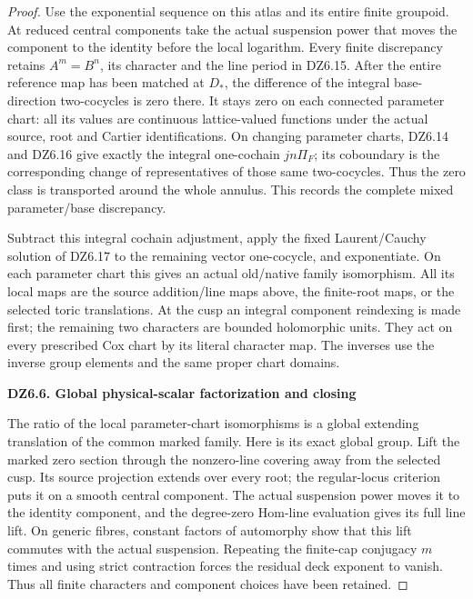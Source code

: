 \begin{proof}
Use the exponential sequence on this atlas and its entire finite
groupoid. At reduced central components take the actual
suspension power that moves the component to the identity before
the local logarithm. Every finite discrepancy retains
\(A^m=B^n\), its character and the line period in DZ6.15.
After the entire reference map has been matched at \(D_*\),
the difference of the integral base-direction two-cocycles is
zero there. It stays zero on each connected parameter chart:
all its values are continuous lattice-valued functions under
the actual source, root and Cartier identifications. On changing
parameter charts, DZ6.14 and DZ6.16 give exactly the integral
one-cochain \(jn\Pi_F\); its coboundary is the corresponding
change of representatives of those same two-cocycles.
Thus the zero class is transported around the whole annulus.
This records the complete mixed parameter/base discrepancy.

Subtract this integral cochain adjustment, apply the fixed
Laurent/Cauchy solution of DZ6.17 to the remaining vector
one-cocycle, and exponentiate. On each parameter chart this
gives an actual old/native family isomorphism. All its local
maps are the source addition/line maps above, the finite-root
maps, or the selected toric translations. At the cusp an
integral component reindexing is made first; the remaining
two characters are bounded holomorphic units. They act on
every prescribed Cox chart by its literal character map.
The inverses use the inverse group elements and the same
proper chart domains.

\par

\medskip\noindent\textbf{DZ6.6. Global physical-scalar factorization and closing}

\par\nobreak

The ratio of the local parameter-chart isomorphisms is a
global extending translation of the common marked family.
Here is its exact global group. Lift the marked zero section
through the nonzero-line covering away from the selected cusp.
Its source projection extends over every root; the regular-locus
criterion puts it on a smooth central component. The actual
suspension power moves it to the identity component, and the
degree-zero Hom-line evaluation gives its full line lift.
On generic fibres, constant factors of automorphy show that
this lift commutes with the actual suspension. Repeating the
finite-cap conjugacy \(m\) times and using strict contraction
forces the residual deck exponent to vanish. Thus all finite
characters and component choices have been retained.


\end{proof}
